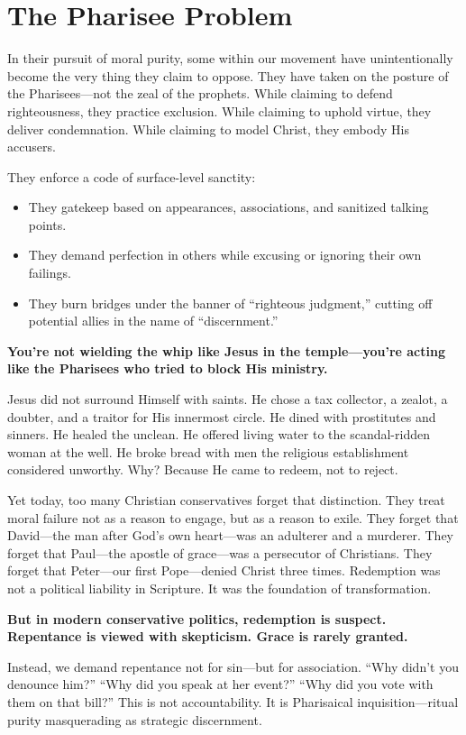 \section{The Pharisee Problem}

In their pursuit of moral purity, some within our movement have unintentionally become the very thing they claim to oppose. They have taken on the posture of the Pharisees—not the zeal of the prophets. While claiming to defend righteousness, they practice exclusion. While claiming to uphold virtue, they deliver condemnation. While claiming to model Christ, they embody His accusers.

They enforce a code of surface-level sanctity:
\begin{itemize}
    \item They gatekeep based on appearances, associations, and sanitized talking points.
    \item They demand perfection in others while excusing or ignoring their own failings.
    \item They burn bridges under the banner of ``righteous judgment,'' cutting off potential allies in the name of ``discernment.''
\end{itemize}

\textbf{You’re not wielding the whip like Jesus in the temple—you’re acting like the Pharisees who tried to block His ministry.}

Jesus did not surround Himself with saints. He chose a tax collector, a zealot, a doubter, and a traitor for His innermost circle. He dined with prostitutes and sinners. He healed the unclean. He offered living water to the scandal-ridden woman at the well. He broke bread with men the religious establishment considered unworthy. Why? Because He came to redeem, not to reject.

Yet today, too many Christian conservatives forget that distinction. They treat moral failure not as a reason to engage, but as a reason to exile. They forget that David—the man after God’s own heart—was an adulterer and a murderer. They forget that Paul—the apostle of grace—was a persecutor of Christians. They forget that Peter—our first Pope—denied Christ three times. Redemption was not a political liability in Scripture. It was the foundation of transformation.

\textbf{But in modern conservative politics, redemption is suspect. Repentance is viewed with skepticism. Grace is rarely granted.}

Instead, we demand repentance not for sin—but for association. ``Why didn’t you denounce him?'' ``Why did you speak at her event?'' ``Why did you vote with them on that bill?'' This is not accountability. It is Pharisaical inquisition—ritual purity masquerading as strategic discernment.

